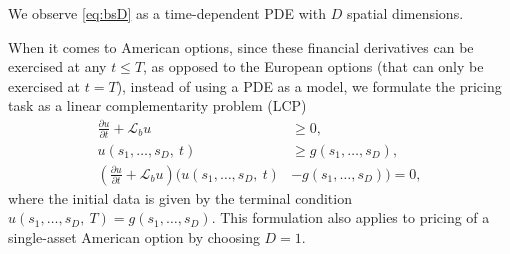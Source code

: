 \documentclass{UUThesisTemplate}
\begin{document}
We observe \eqref{eq:bsD} as a time-dependent PDE with $D$ spatial dimensions.
\par When it comes to American options, since these financial derivatives can be exercised at any $t \leq T$, as opposed to the European options (that can only be exercised at $t=T$), instead of using a PDE as a model, we formulate the pricing task as a linear complementarity problem (LCP)
\begin{align}
\frac{\partial u}{\partial t}+\mathcal{L}_b u&\geq 0,\nonumber \\
u(s_1,\ldots, s_D,\ t)&\geq g(s_1,\ldots, s_D), \nonumber \\
\left( \frac{\partial u}{\partial t}+\mathcal{L}_b u\right) \big(u(s_1,\ldots, s_D,\ t) &-g(s_1,\ldots, s_D)\big)=0, \label{eqlcp}
\end{align}
where the initial data is given by the terminal condition $u(s_1,\ldots,s_D,\ T)=g(s_1,\ldots,s_D)$. This formulation also applies to pricing of a single-asset American option by choosing $D=1$. 
%
\end{document}
